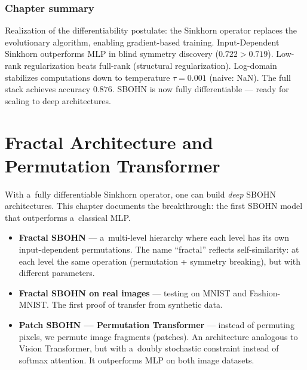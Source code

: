 \documentclass[11pt,a4paper]{report}
\begin{document}


\subsection*{Chapter summary}
Realization of the differentiability postulate: the Sinkhorn operator replaces the evolutionary algorithm, enabling gradient-based training. Input-Dependent Sinkhorn outperforms MLP in blind symmetry discovery ($0.722 > 0.719$). Low-rank regularization beats full-rank (structural regularization). Log-domain stabilizes computations down to temperature $\tau{=}0.001$ (naive: NaN). The full stack achieves accuracy $0.876$. SBOHN is now fully differentiable --- ready for scaling to deep architectures.

\newpage


\chapter{Fractal Architecture and Permutation Transformer}

With a~fully differentiable Sinkhorn operator, one can build \emph{deep} SBOHN architectures. This chapter documents the breakthrough: the first SBOHN model that outperforms a~classical MLP.

\begin{itemize}
\item \textbf{Fractal SBOHN} --- a~multi-level hierarchy where each level has its own input-dependent permutations. The name ``fractal'' reflects self-similarity: at each level the same operation (permutation + symmetry breaking), but with different parameters.
\item \textbf{Fractal SBOHN on real images} --- testing on MNIST and Fashion-MNIST. The first proof of transfer from synthetic data.
\item \textbf{Patch SBOHN --- Permutation Transformer} --- instead of permuting pixels, we permute image fragments (patches). An architecture analogous to Vision Transformer, but with a~doubly stochastic constraint instead of softmax attention. It outperforms MLP on both image datasets.
\end{itemize}


\end{document}
